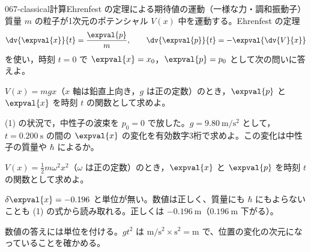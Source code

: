 \documentclass[uplatex,dvipdfmx,a4paper,11pt]{jsarticle}
\begin{document}
\begin{mondai}{067-classical}{計算}{Ehrenfest の定理による期待値の運動（一様な力・調和振動子）}
質量 $m$ の粒子が1次元のポテンシャル $V(x)$ 中を運動する。Ehrenfest の定理
  \[ \dv{\expval{x}}{t}=\frac{\expval{p}}{m},\qquad \dv{\expval{p}}{t}=-\expval{\dv{V}{x}} \]
  を使い，時刻 $t=0$ で $\expval{x}=x_{0}$，$\expval{p}=p_{0}$ として次の問いに答えよ。
  \begin{shoumon}
    \item $V(x)=mgx$（$x$ 軸は鉛直上向き，$g$ は正の定数）のとき，$\expval{p}$ と $\expval{x}$ を時刻 $t$ の関数として求めよ。
    \item (1) の状況で，中性子の波束を $p_{0}=0$ で放した。$g=\qty{9.80}{\metre\per\second\squared}$ として，$t=\qty{0.200}{\second}$ の間の $\expval{x}$ の変化を有効数字3桁で求めよ。この変化は中性子の質量や $\hbar$ によるか。
    \item $V(x)=\frac{1}{2}m\omega^{2}x^{2}$（$\omega$ は正の定数）のとき，$\expval{x}$ と $\expval{p}$ を時刻 $t$ の関数として求めよ。
  \end{shoumon}

\begin{kotaeran}
   $\delta\expval{x}=-0.196$ と単位が無い。数値は正しく、質量にも $\hbar$ にもよらないことも (1) の式から読み取れる。正しくは $\qty{-0.196}{\metre}$（$\qty{0.196}{\metre}$ 下がる）。
\end{kotaeran}
\begin{rikai}
  \item 数値の答えには単位を付ける。$gt^{2}$ は $\unit{\metre\per\second\squared}\times\unit{\second\squared}=\unit{\metre}$ で、位置の変化の次元になっていることを確かめる。
\end{rikai}
\end{mondai}
\end{document}
